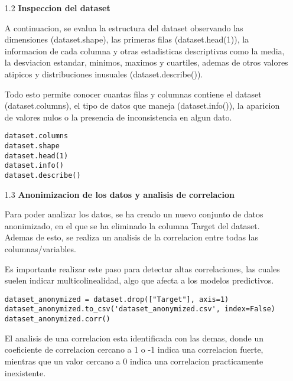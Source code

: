 \documentclass{article}
\begin{document}
\begin{itemize}

\item[1.2]  {\bf Inspeccion del dataset}

A continuacion, se evalua la estructura del dataset observando las dimensiones (dataset.shape), las primeras filas (dataset.head(1)), la informacion de cada columna y otras estadisticas descriptivas como la media, la desviacion estandar, minimos, maximos y cuartiles, ademas de otros valores atipicos y distribuciones inusuales (dataset.describe()).

Todo esto permite conocer cuantas filas y columnas contiene el dataset (dataset.columns), el tipo de datos que maneja (dataset.info()), la aparicion de valores nulos o la presencia de inconsistencia en algun dato.

\begin{tcolorbox}[width=14cm]
\begin{scriptsize}
\begin{verbatim}
dataset.columns
dataset.shape
dataset.head(1)
dataset.info()
dataset.describe()
\end{verbatim}
\end{scriptsize}
\end{tcolorbox}

\end{itemize}

\bigskip

\begin{itemize}

\item[1.3]  {\bf Anonimizacion de los datos y analisis de correlacion}

Para poder analizar los datos, se ha creado un nuevo conjunto de datos anonimizado, en el que se ha eliminado la columna Target del dataset. Ademas de esto, se realiza un analisis de la correlacion entre todas las columnas/variables.

Es importante realizar este paso para detectar altas correlaciones, las cuales suelen indicar multicolinealidad, algo que afecta a los modelos predictivos.

\begin{tcolorbox}[width=14cm]
\begin{scriptsize}
\begin{verbatim}
dataset_anonymized = dataset.drop(["Target"], axis=1)
dataset_anonymized.to_csv('dataset_anonymized.csv', index=False)
dataset_anonymized.corr()
\end{verbatim}
\end{scriptsize}
\end{tcolorbox}

El analisis de una correlacion esta identificada con las demas, donde un coeficiente de correlacion cercano a 1 o -1 indica una correlacion fuerte, mientras que un valor cercano a 0 indica una correlacion practicamente inexistente.

\end{itemize}
\end{document}
